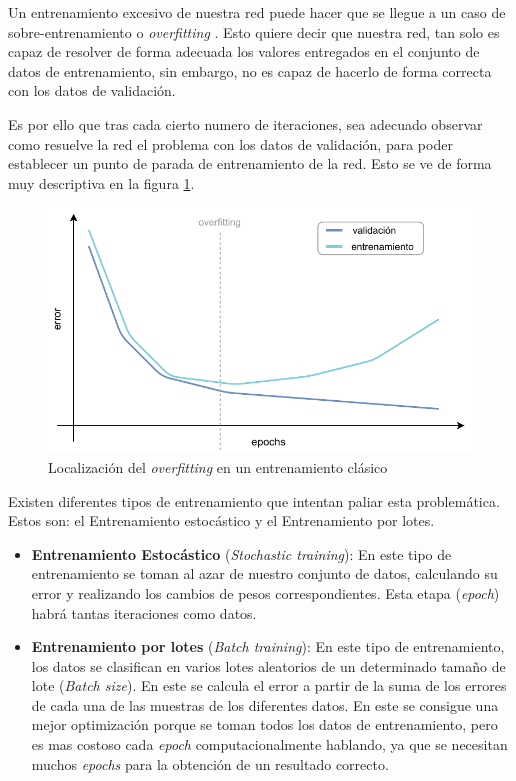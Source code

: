 Un entrenamiento excesivo de nuestra red puede hacer que se llegue a un caso de sobre-entrenamiento o \textit{overfitting} \cite{salman2019overfitting}. Esto quiere decir que nuestra red, tan solo es capaz de resolver de forma adecuada los valores entregados en el conjunto de datos de entrenamiento, sin embargo, no es capaz de hacerlo de forma correcta con los datos de validación.

Es por ello que tras cada cierto numero de iteraciones, sea adecuado observar como resuelve la red el problema con los datos de validación, para poder establecer un punto de parada de entrenamiento de la red. Esto se ve de forma muy descriptiva en la figura \ref{fig:overfitting}.

\begin{figure}[!h]
    \centering
    \includegraphics[width=1\textwidth]{figuras/desarrollo teorico/overfitting.pdf}
    \caption{Localización del \textit{overfitting} en un entrenamiento clásico}
    \label{fig:overfitting}
    \end{figure}

Existen diferentes tipos de entrenamiento que intentan paliar esta problemática. Estos son: el Entrenamiento estocástico y el Entrenamiento por lotes.

\begin{itemize}
    \item \textbf{Entrenamiento Estocástico} (\textit{Stochastic training}): En este tipo de entrenamiento se toman al azar de nuestro conjunto de datos, calculando su error y realizando los cambios de pesos correspondientes. Esta etapa (\textit{epoch}) habrá tantas iteraciones como datos.
    
    \item \textbf{Entrenamiento por lotes} (\textit{Batch training}): En este tipo de entrenamiento, los datos se clasifican en varios lotes aleatorios de un determinado tamaño de lote (\textit{Batch size}). En este se calcula el error a partir de la suma de los errores de cada una de las muestras de los diferentes datos. En este se consigue una mejor optimización porque se toman todos los datos de entrenamiento, pero es mas costoso cada \textit{epoch} computacionalmente hablando, ya que se necesitan muchos \textit{epochs} para la obtención de un resultado correcto.
\end{itemize}


